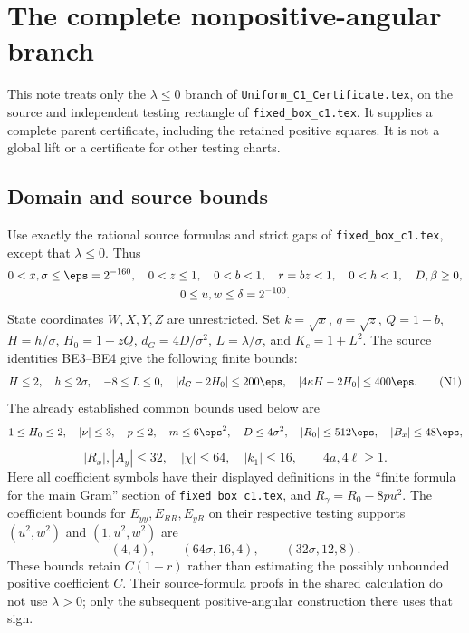 \section{The complete nonpositive-angular branch}\label{sec:fixed-c1-nonpositive}

This note treats only the $\lambda\le0$ branch of
\texttt{Uniform\_C1\_Certificate.tex}, on the source and independent
testing rectangle of \texttt{fixed\_box\_c1.tex}. It supplies a complete
parent certificate, including the retained positive squares. It is not a
global lift or a certificate for other testing charts.

\subsection{Domain and source bounds}

Use exactly the rational source formulas and strict gaps of
\texttt{fixed\_box\_c1.tex}, except that $\lambda\le0$. Thus
\[
 \begin{gathered}
 0<x,\sigma\le\eps=2^{-160},\quad 0<z\le1,\quad
 0<b<1,\quad r=bz<1,\quad 0<h<1,\quad D,\beta\ge0,
 \\ 0\le u,w\le\delta=2^{-100}.
 \end{gathered}
\]
State coordinates $W,X,Y,Z$ are unrestricted. Set $k=\sqrt x$,
$q=\sqrt z$, $Q=1-b$, $H=h/\sigma$, $H_0=1+zQ$,
$d_G=4D/\sigma^2$, $L=\lambda/\sigma$, and $K_c=1+L^2$.
The source identities BE3--BE4 give the following finite bounds:
\[
 H\le2,\quad h\le2\sigma,\quad -8\le L\le0,\quad
 |d_G-2H_0|\le200\eps,\quad
 |4\kappa H-2H_0|\le400\eps.                 \tag{N1}
\]
The already established common bounds used below are
\[
 1\le H_0\le2,\quad |\nu|\le3,\quad p\le2,\quad
 m\le6\eps^2,\quad D\le4\sigma^2,\quad
 |R_0|\le512\eps,\quad |B_x|\le48\eps,
\]
\[
 |R_x|,|A_y|\le32,\quad |\chi|\le64,\quad
 |k_1|\le16,\qquad 4a,4\ell\ge1.           \tag{N2}
\]
Here all coefficient symbols have their displayed definitions in the
``finite formula for the main Gram'' section of
\texttt{fixed\_box\_c1.tex}, and $R_\gamma=R_0-8pu^2$.
The coefficient bounds for $E_{yy},E_{RR},E_{yR}$ on their respective
testing supports $(u^2,w^2)$ and $(1,u^2,w^2)$ are
\[
 (4,4),\qquad (64\sigma,16,4),\qquad
 (32\sigma,12,8).                         \tag{N3}
\]
These bounds retain $C(1-r)$ rather than estimating the possibly
unbounded positive coefficient $C$. Their source-formula proofs in the
shared calculation do not use $\lambda>0$; only the subsequent
positive-angular construction there uses that sign.


